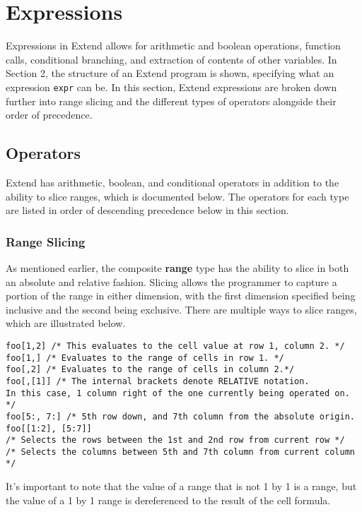 \section{Expressions}
	Expressions in Extend allows for arithmetic and boolean operations, function calls, conditional branching, and extraction of contents of other variables. In Section 2, the structure of an Extend program is shown, specifying what an expression \texttt{expr} can be. In this section, Extend expressions are broken down further into range slicing and the different types of operators alongside their order of precedence.
	\subsection{Operators}
		Extend has arithmetic, boolean, and conditional operators in addition to the ability to slice ranges, which is documented below. The operators for each type are listed in order of descending precedence below in this section.
		\subsubsection{Range Slicing}
			As mentioned earlier, the composite \textbf{range} type has the ability to slice in both an absolute and relative fashion. Slicing allows the programmer to capture a portion of the range in either dimension, with the first dimension specified being inclusive and the second being exclusive. There are multiple ways to slice ranges, which are illustrated below.\newline
			\begin{lstlisting}
foo[1,2] /* This evaluates to the cell value at row 1, column 2. */
foo[1,] /* Evaluates to the range of cells in row 1. */
foo[,2] /* Evaluates to the range of cells in column 2.*/
foo[,[1]] /* The internal brackets denote RELATIVE notation. 
In this case, 1 column right of the one currently being operated on. */ 
foo[5:, 7:] /* 5th row down, and 7th column from the absolute origin.
foo[[1:2], [5:7]] 
/* Selects the rows between the 1st and 2nd row from current row */
/* Selects the columns between 5th and 7th column from current column */
			\end{lstlisting}
			It's important to note that the value of a range that is not 1 by 1 is a range, but the value of a 1 by 1 range is dereferenced to the result of the cell formula.
